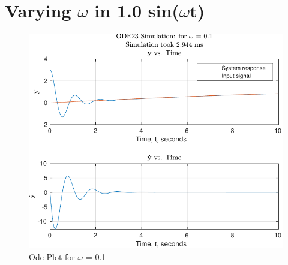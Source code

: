 \documentclass[12pt]{article}
\begin{document}
					
	\section{Varying $\omega$ in 1.0 sin($\omega$t)}
		
		
		
		
		\begin{figure}[H]
			\centering
			\includegraphics[width=1\linewidth]{Code/Fig/ode_sin_input_0.1}
			\caption{Ode Plot for $\omega$ = 0.1}
			\label{fig:odesininput0}
		\end{figure}
		
\end{document}
